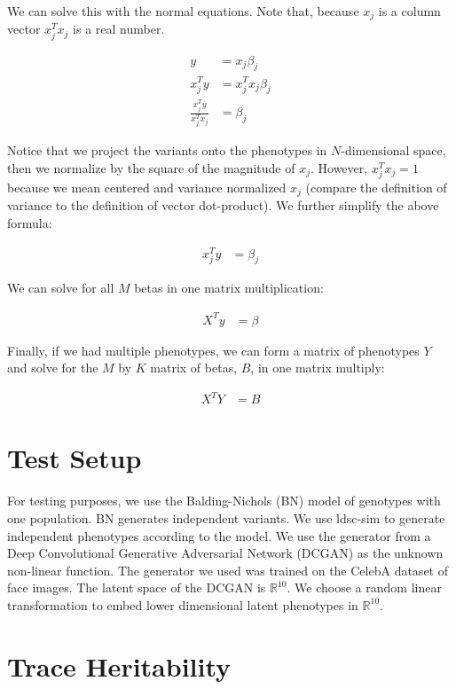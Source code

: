 \documentclass{article}
\newcommand{\R}{\mathbb{R}}
\begin{document}
We can solve this with the normal equations. Note that, because $x_j$ is a column vector $x_j^T x_j$
is a real number.

\begin{align*}
y &= x_j \beta_j \\
x_j^T y &= x_j^T x_j \beta_j \\
\frac{x_j^T y}{x_j^T x_j} &= \beta_j
\end{align*}

Notice that we project the variants onto the phenotypes in $N$-dimensional space, then we normalize
by the square of the magnitude of $x_j$. However, $x_j^T x_j = 1$ because we mean centered and
variance normalized $x_j$ (compare the definition of variance to the definition of vector dot-product). We further simplify the above formula:

\begin{align*}
x_j^T y &= \beta_j
\end{align*}

We can solve for all $M$ betas in one matrix multiplication:

\begin{align*}
X^T y &= \beta
\end{align*}

Finally, if we had multiple phenotypes, we can form a matrix of phenotypes $Y$ and solve for the $M$
by $K$ matrix of betas, $B$, in one matrix multiply:

\begin{align*}
X^T Y &= B
\end{align*}

\section{Test Setup}

For testing purposes, we use the Balding-Nichols (BN) model of genotypes with one population. BN
generates independent variants. We use ldsc-sim to generate independent phenotypes according to the
model. We use the generator from a Deep Convolutional Generative Adversarial Network (DCGAN) as the
unknown non-linear function. The generator we used was trained on the CelebA dataset of face
images. The latent space of the DCGAN is $\R^{10}$. We choose a random linear transformation to embed
lower dimensional latent phenotypes in $\R^{10}$.

\section{Trace Heritability}
\end{document}

